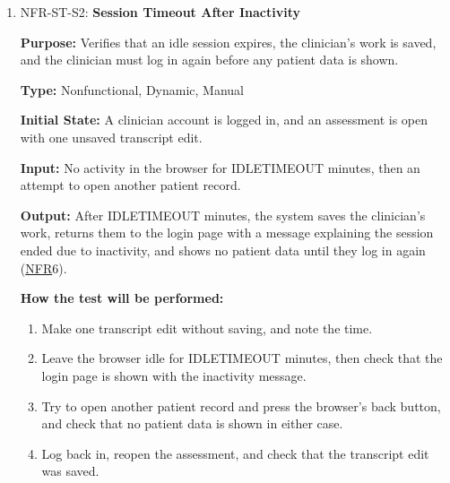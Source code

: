 \documentclass[12pt, titlepage]{article}
\newcommand{\srsnfr}[1]{\href{https://github.com/Nour-Fawaz/MacaBoca/blob/main/pdfs/SRS/SRS.pdf}{NFR}}
\renewcommand{\_}{\oldunderscore\allowbreak}
\begin{document}
\begin{enumerate}
  \item NFR-ST-S2: \textbf{Session Timeout After Inactivity\\}
  \begin{mdframed}[linewidth=0.5mm]
      \textbf{Purpose:} Verifies that an idle session expires, the clinician's work is saved, and the clinician must log in again before any patient data is shown. \par
      \textbf{Type:} Nonfunctional, Dynamic, Manual \par
      \textbf{Initial State:} A clinician account is logged in, and an assessment is open with one unsaved transcript edit. \par
      \textbf{Input:} No activity in the browser for IDLE\_TIMEOUT minutes, then an attempt to open another patient record. \par
      \textbf{Output:} After IDLE\_TIMEOUT minutes, the system saves the clinician's work, returns them to the login page with a message explaining the session ended due to inactivity, and shows no patient data until they log in again (\srsnfr*{6}). \par
      \textbf{How the test will be performed:}
      \begin{enumerate}
      \item[1.] Make one transcript edit without saving, and note the time.
      \item[2.] Leave the browser idle for IDLE\_TIMEOUT minutes, then check that the login page is shown with the inactivity message.
      \item[3.] Try to open another patient record and press the browser's back button, and check that no patient data is shown in either case.
      \item[4.] Log back in, reopen the assessment, and check that the transcript edit was saved.
      \end{enumerate}
  \end{mdframed}


\end{enumerate}
\end{document}
